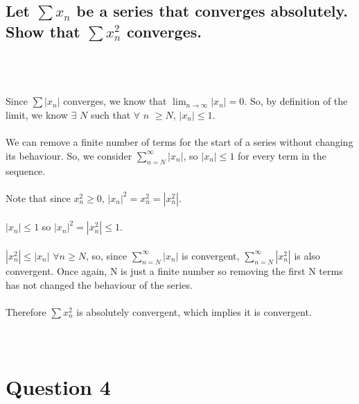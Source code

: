 \documentclass{article}
\begin{document}
\subsection*{Let $\sum x_n$ be a series that converges absolutely. Show that $\sum x^2_n$ converges.}
\solution
\\
\\
\\
Since \(\sum |x_n|\) converges, we know that $\lim_{n\to\infty} |x_n|$\(=0\). So, by definition of the limit, we know \(\exists\) \(N\) such that \(\forall\) \(n\) \(\geq N\), \(|x_n| \leq 1\).
\\
\\
We can remove a finite number of terms for the start of a series without changing its behaviour. So, we consider \(\sum_{n=N}^{\infty} |x_n|\), so \(|x_n|\leq 1\) for every term in the sequence.
\\
\\
Note that since \(x_n^2 \geq 0\), \(|x_n|^2 = x_n^2 = |x_n^2|\). 
\\
\\
\(|x_n| \leq 1\) so \(|x_n|^2 = |x_n^2| \leq 1\).
\\
\\
\(|x_n^2| \leq |x_n|\) \(\forall n \geq N\), so, since \(\sum_{n=N}^{\infty} |x_n|\) is convergent, \(\sum_{n=N}^{\infty} |x_n^2|\) is also convergent. Once again, N is just a finite number so removing the first N terms has not changed the behaviour of the series.
\\
\\
Therefore \(\sum x_n^2\) is absolutely convergent, which implies it is convergent.
\\
\\
\\
\section*{Question 4}
\end{document}
